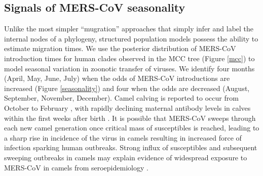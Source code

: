 \documentclass[11pt,oneside,letterpaper]{article}
\def\lmc#1{\textcolor{green}{[#1]}}
\begin{document}
\subsection*{Signals of MERS-CoV seasonality}
Unlike the most simpler %
``mugration'' approaches that simply infer and label the internal nodes of a phylogeny, structured population models possess the ability to estimate migration times.
We use the posterior distribution of MERS-CoV introduction times for human clades observed in the MCC tree (Figure \ref{mcc}) to model seasonal variation in zoonotic transfer of viruses.
We identify four months (April, May, June, July) when the odds of MERS-CoV introductions are increased (Figure \ref{seasonality}) and four when the odds are decreased (August, September, November, December).
Camel calving is reported to occur from October to February \citep{almutairi_non-genetic_2010}, with rapidly declining maternal antibody levels in calves within the first weeks after birth \citep{wernery_camelid_2001}.
It is possible that MERS-CoV sweeps through each new camel generation once critical mass of susceptibles is reached, leading to a sharp rise in incidence of the virus in camels resulting in increased force of infection sparking human outbreaks.
Strong influx of susceptibles and subsequent sweeping outbreaks in camels may explain evidence of widespread exposure to MERS-CoV in camels from seroepidemiology \citep{muller_2014,corman_antibodies_2014,chu_2014,reusken_2013,reusken_2014}.
\end{document}
